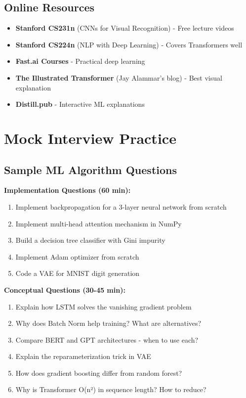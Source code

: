 \documentclass[10pt]{article}
\begin{document}
\subsection{Online Resources}

\begin{itemize}
\item \textbf{Stanford CS231n} (CNNs for Visual Recognition) - Free lecture videos
\item \textbf{Stanford CS224n} (NLP with Deep Learning) - Covers Transformers well
\item \textbf{Fast.ai Courses} - Practical deep learning
\item \textbf{The Illustrated Transformer} (Jay Alammar's blog) - Best visual explanation
\item \textbf{Distill.pub} - Interactive ML explanations
\end{itemize}

\section{Mock Interview Practice}

\subsection{Sample ML Algorithm Questions}

\textbf{Implementation Questions (60 min):}
\begin{enumerate}
\item Implement backpropagation for a 3-layer neural network from scratch
\item Implement multi-head attention mechanism in NumPy
\item Build a decision tree classifier with Gini impurity
\item Implement Adam optimizer from scratch
\item Code a VAE for MNIST digit generation
\end{enumerate}

\textbf{Conceptual Questions (30-45 min):}
\begin{enumerate}
\item Explain how LSTM solves the vanishing gradient problem
\item Why does Batch Norm help training? What are alternatives?
\item Compare BERT and GPT architectures - when to use each?
\item Explain the reparameterization trick in VAE
\item How does gradient boosting differ from random forest?
\item Why is Transformer O(n²) in sequence length? How to reduce?
\end{enumerate}
\end{document}
